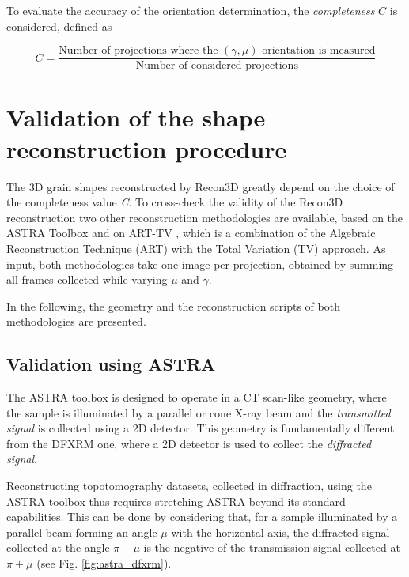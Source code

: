 \documentclass[11pt]{scrartcl}
\begin{document}
To evaluate the accuracy of the orientation determination, the {\emph{completeness}} $C$ is considered, defined as 

\begin{equation}
    C = \frac{\text{Number of projections where the } (\gamma, \mu) \text{ orientation is measured}}{\text{Number of considered projections}}
\end{equation}

\section{Validation of the shape reconstruction procedure}
\label{sec:validation}

The {\footnotesize{3D}} grain shapes reconstructed by Recon3D greatly depend on the choice of the completeness value {\emph{C}}. To cross-check the validity of the Recon3D reconstruction two other reconstruction methodologies are available, based on the {\footnotesize{ASTRA}} Toolbox \cite{van2015astra, van2016fast} and on {\footnotesize{ART-TV}} \cite{laroque2008accurate}, which is a combination of the Algebraic Reconstruction Technique ({\footnotesize{ART}}) with the Total Variation ({\footnotesize{TV}}) approach. As input, both methodologies take one image per projection, obtained by summing all frames collected while varying $\mu$ and $\gamma$. 

In the following, the geometry and the reconstruction scripts of both methodologies are presented. 

\subsection{Validation using ASTRA}

The {\footnotesize{ASTRA}} toolbox \cite{van2015astra, van2016fast} is designed to operate in a {\footnotesize{CT}} scan-like geometry, where the sample is illuminated by a parallel or cone {\footnotesize{X}}-ray beam and the {\emph{transmitted signal}} is collected using a {\footnotesize{2D}} detector. This geometry is fundamentally different from the {\footnotesize{DFXRM}} one, where a {\footnotesize{2D}} detector is used to collect the {\emph{diffracted signal}}. 

Reconstructing topotomography datasets, collected in diffraction, using the {\footnotesize{ASTRA}} toolbox thus requires stretching {\footnotesize{ASTRA}} beyond its standard capabilities. This can be done by considering that, for a sample illuminated by a parallel beam forming an angle $\mu$ with the horizontal axis, the diffracted signal collected at the angle $\pi - \mu$ is the negative of the transmission signal collected at $\pi + \mu$ (see Fig. \ref{fig:astra_dfxrm}).
\end{document}
